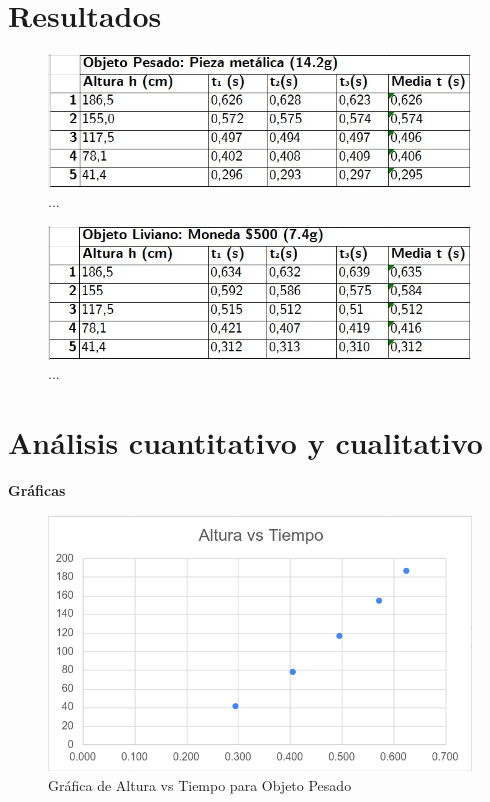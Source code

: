 \begin{multicols}{2}
\section*{Resultados}
\begin{figure}[H]
    \centering
    \includegraphics[scale=0.3]{fig/Tabla1-ObjetoPesado.png}
    \caption{...}
    \label{fig:tabla1}
\end{figure}

\begin{figure}[H]
    \centering
    \includegraphics[scale=0.3]{fig/Tabla2-ObjetoLiviano.png}
    \caption{...}
    \label{fig:tabla2}
\end{figure}

\section*{Análisis cuantitativo y cualitativo} 
\textbf{Gráficas}
        \begin{figure}[H]
            \centering
            \includegraphics[scale=0.5]{fig/objPesado-Altura-Tiempo.png}
            \caption{Gráfica de Altura vs Tiempo para Objeto Pesado}
        \end{figure}
        

\end{multicols}
